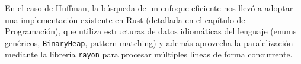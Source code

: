 En el caso de Huffman, la búsqueda de un enfoque eficiente nos llevó a adoptar una implementación existente en Rust (detallada en el capítulo de Programación), que utiliza estructuras de datos idiomáticas del lenguaje (enums genéricos, \texttt{BinaryHeap}, pattern matching) y además aprovecha la paralelización mediante la librería \texttt{rayon} para procesar múltiples líneas de forma concurrente.
